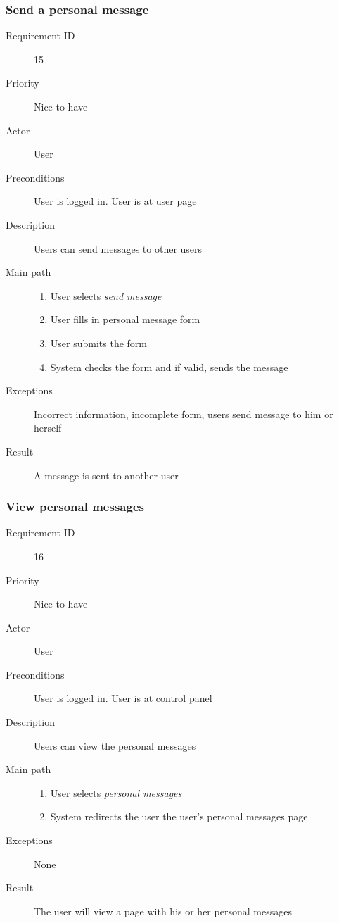 		\subsubsection{Send a personal message}
			\begin{description}
				\item[Requirement ID] 15
				\item[Priority] Nice to have
				\item[Actor] User
				\item[Preconditions] User is logged in. User is at user page
				\item[Description] Users can send messages to other users
				\item[Main path]
 					\begin{enumerate}
						\item User selects \emph{send message}
						\item User fills in personal message form
						\item User submits the form
						\item System checks the form and if valid, sends the message
					\end{enumerate}
				\item[Exceptions] Incorrect information, incomplete form, users send message to him or herself
				\item[Result] A message is sent to another user
			\end{description}
		\subsubsection{View personal messages}
			\begin{description}
				\item[Requirement ID] 16
				\item[Priority] Nice to have
				\item[Actor] User
				\item[Preconditions] User is logged in. User is at control panel
				\item[Description] Users can view the personal messages
				\item[Main path]
 					\begin{enumerate}
						\item User selects \emph{personal messages}
						\item System redirects the user the user's personal messages page
					\end{enumerate}
				\item[Exceptions] None
				\item[Result] The user will view a page with his or her personal messages
			\end{description}

